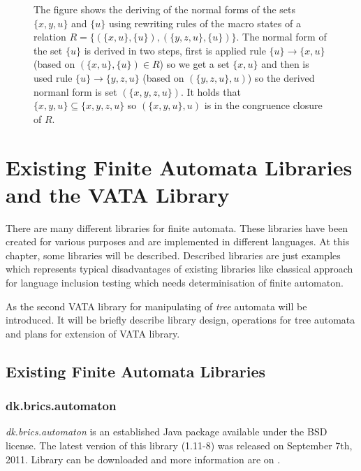\begin{figure}[h]
  \begin{center}
    
    \label{figHKCRew}
    \caption{The figure shows the deriving of the normal forms of the sets $\{x,y,u\}$ and $\{u\}$ using rewriting
      rules of the macro states of a relation $R=\{(\{x,u\},\{u\}),(\{y,z,u\},\{u\})\}$. The normal form of the set $\{u\}$
      is derived in two steps, first is applied rule $\{u\}\rightarrow\{x,u\}$ (based on $(\{x,u\},\{u\})\in R$) so we get a set $\{x,u\}$ and then is used rule 
      $\{u\}\rightarrow\{y,z,u\}$ (based on $(\{y,z,u\},u)$) so the derived normanl form is set $(\{x,y,z,u\})$. 
      It holds that $\{x,y,u\}\subseteq \{x,y,z,u\}$ so $(\{x,y,u\},u)$ is in the congruence closure of $R$.}
  \end{center}
\end{figure}

\chapter{Existing Finite Automata Libraries and the VATA Library} 
\label{libraries}
There are many different libraries for finite automata. These libraries have been created for various purposes and 
are implemented in different languages. 
At this chapter, some libraries will be described. Described libraries are just examples which represents typical disadvantages of existing libraries like
classical approach for language inclusion testing which needs determinisation of finite automaton. 

As the second VATA library for manipulating of \emph{tree} automata will be introduced. It will be briefly describe library design, operations for tree
automata and plans for extension of VATA library.

\section{Existing Finite Automata Libraries}
\label{existinglibraries}
\subsection{dk.brics.automaton}
\label{brics}
\emph{dk.brics.automaton} is an established Java package available under the BSD license. The latest version of this library (1.11-8) 
was released on September 7th, 2011.
Library can be downloaded and more information are on \cite{brics}. 

